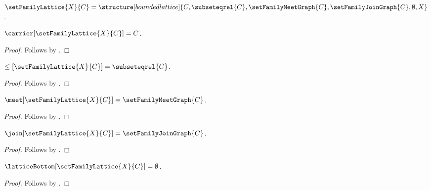 \begin{definition}\label{set_family_lattice}
    $\setFamilyLattice{X}{C}=
        \structure[bounded lattice]{
            C,
            \subseteqrel{C},
            \setFamilyMeetGraph{C},
            \setFamilyJoinGraph{C},
            \emptyset,
            X
        }$.
\end{definition}

\begin{proposition}\label{set_family_lattice_carrier}
    $\carrier[\setFamilyLattice{X}{C}]=C$.
\end{proposition}
\begin{proof}
    Follows by
        .
\end{proof}

\begin{proposition}\label{set_family_lattice_order}
    $\leq[\setFamilyLattice{X}{C}]=\subseteqrel{C}$.
\end{proposition}
\begin{proof}
    Follows by
        .
\end{proof}

\begin{proposition}\label{set_family_lattice_meet}
    $\meet[\setFamilyLattice{X}{C}]=\setFamilyMeetGraph{C}$.
\end{proposition}
\begin{proof}
    Follows by
        .
\end{proof}

\begin{proposition}\label{set_family_lattice_join}
    $\join[\setFamilyLattice{X}{C}]=\setFamilyJoinGraph{C}$.
\end{proposition}
\begin{proof}
    Follows by
        .
\end{proof}

\begin{proposition}\label{set_family_lattice_bottom}
    $\latticeBottom[\setFamilyLattice{X}{C}]=\emptyset$.
\end{proposition}
\begin{proof}
    Follows by
        .
\end{proof}

